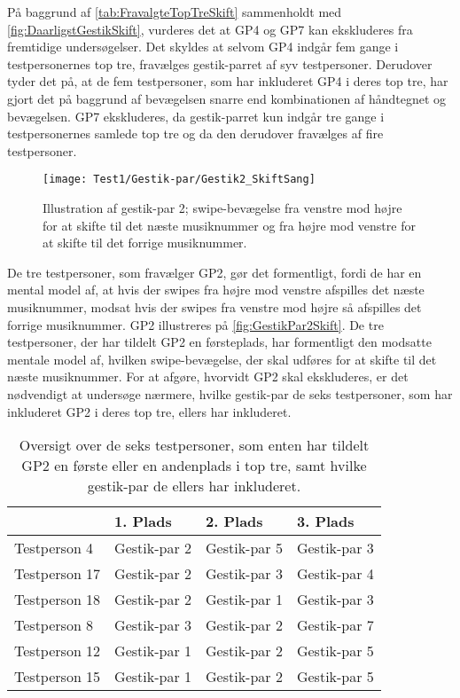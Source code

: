 \noindent
%
På baggrund af \autoref{tab:FravalgteTopTreSkift} sammenholdt med \autoref{fig:DaarligstGestikSkift}, vurderes det at GP4 og GP7 kan ekskluderes fra fremtidige undersøgelser. Det skyldes at selvom GP4 indgår fem gange i testpersonernes top tre, fravælges gestik-parret af syv testpersoner. Derudover tyder det på, at de fem testpersoner, som har inkluderet GP4 i deres top tre, har gjort det på baggrund af bevægelsen snarre end kombinationen af håndtegnet og bevægelsen. GP7 ekskluderes, da gestik-parret kun indgår tre gange i testpersonernes samlede top tre og da den derudover fravælges af fire testpersoner. 
%
\begin{figure}[H]
	\centering
	\texttt{[image: Test1/Gestik-par/Gestik2\_SkiftSang]}
	\caption{Illustration af gestik-par 2; swipe-bevægelse fra venstre mod højre for at skifte til det næste musiknummer og fra højre mod venstre for at skifte til det forrige musiknummer.}
	\label{fig:GestikPar2Skift}
\end{figure}
\noindent
%
De tre testpersoner, som fravælger GP2, gør det formentligt, fordi de har en mental model af, at hvis der swipes fra højre mod venstre afspilles det næste musiknummer, modsat hvis der swipes fra venstre mod højre så afspilles det forrige musiknummer. GP2 illustreres på \autoref{fig:GestikPar2Skift}. De tre testpersoner, der har tildelt GP2 en førsteplads, har formentligt den modsatte mentale model af, hvilken swipe-bevægelse, der skal udføres for at skifte til det næste musiknummer. For at afgøre, hvorvidt GP2 skal ekskluderes, er det nødvendigt at undersøge nærmere, hvilke gestik-par de seks testpersoner, som har inkluderet GP2 i deres top tre, ellers har inkluderet. 
%
\begin{table}[H]
	\centering
	\begin{tabular}{ | p{3cm} | p{3cm} | p{3cm} | p{3cm} |}
	\hline
		 & 1. Plads & 2. Plads & 3. Plads \\ \hline
		Testperson 4 & Gestik-par 2 & Gestik-par 5 & Gestik-par 3 \\ \hline
		Testperson 17 & Gestik-par 2 & Gestik-par 3 & Gestik-par 4 \\ \hline
		Testperson 18 & Gestik-par 2 & Gestik-par 1 & Gestik-par 3 \\ \hline
		Testperson 8 & Gestik-par 3 & Gestik-par 2 & Gestik-par 7 \\ \hline
		Testperson 12 & Gestik-par 1 & Gestik-par 2 & Gestik-par 5\\ \hline
		Testperson 15 & Gestik-par 1 & Gestik-par 2 & Gestik-par 5 \\ \hline
	\end{tabular}
	\caption{Oversigt over de seks testpersoner, som enten har tildelt GP2 en første eller en andenplads i top tre, samt hvilke gestik-par de ellers har inkluderet.}
	\label{tab:GestikPar2ITopTre}
\end{table}
